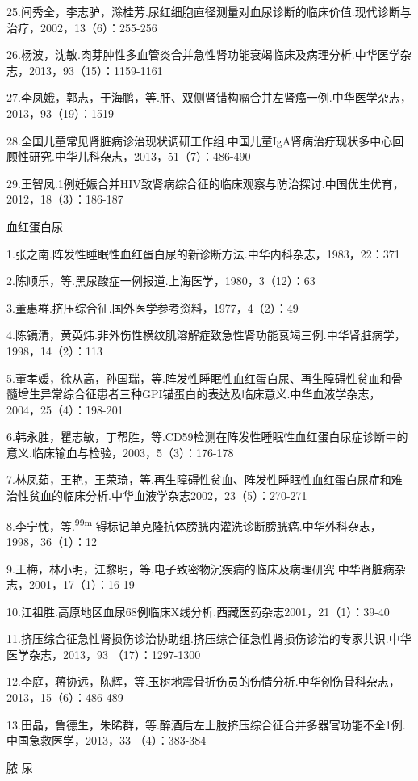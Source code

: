 25.间秀全，李志驴，滁桂芳.尿红细胞直径测量对血尿诊断的临床价值.现代诊断与治疗，2002，13（6）：255-256

26.杨波，沈敏.肉芽肿性多血管炎合并急性肾功能衰竭临床及病理分析.中华医学杂志，2013，93（15）：1159-1161

27.李凤娥，郭志，于海鹏，等.肝、双侧肾错构瘤合并左肾癌一例.中华医学杂志，2013，93（19）：1519

28.全国儿童常见肾脏病诊治现状调研工作组.中国儿童IgA肾病治疗现状多中心回顾性研究.中华儿科杂志，2013，51（7）：486-490

29.王智凤.1例妊娠合并HIV致肾病综合征的临床观察与防治探讨.中国优生优育，2012，18（3）：186-187

血红蛋白尿

1.张之南.阵发性睡眠性血红蛋白尿的新诊断方法.中华内科杂志，1983，22：371

2.陈顺乐，等.黑尿酸症一例报道.上海医学，1980，3（12）：63

3.董惠群.挤压综合征.国外医学参考资料，1977，4（2）：49

4.陈镜清，黄英炜.非外伤性横纹肌溶解症致急性肾功能衰竭三例.中华肾脏病学，1998，14（2）：113

5.董孝媛，徐从高，孙国瑞，等.阵发性睡眠性血红蛋白尿、再生障碍性贫血和骨髓增生异常综合征患者三种GPI锚蛋白的表达及临床意义.中华血液学杂志，2004，25（4）：198-201

6.韩永胜，瞿志敏，丁帮胜，等.CD59检测在阵发性睡眠性血红蛋白尿症诊断中的意义.临床输血与检验，2003，5（3）：176-178

7.林凤茹，王艳，王荣琦，等.再生障碍性贫血、阵发性睡眠性血红蛋白尿症和难治性贫血的临床分析.中华血液学杂志2002，23（5）：270-271

8.李宁忱，等.\textsuperscript{99m}
锝标记单克隆抗体膀胱内灌洗诊断膀胱癌.中华外科杂志，1998，36（1）：12

9.王梅，林小明，江黎明，等.电子致密物沉疾病的临床及病理研究.中华肾脏病杂志，2001，17（1）：16-19

10.江祖胜.高原地区血尿68例临床X线分析.西藏医药杂志2001，21（1）：39-40

11.挤压综合征急性肾损伤诊治协助组.挤压综合征急性肾损伤诊治的专家共识.中华医学杂志，2013，93
（17）：1297-1300

12.李庭，蒋协远，陈辉，等.玉树地震骨折伤员的伤情分析.中华创伤骨科杂志，2013，15（6）：486-489

13.田晶，鲁德生，朱晞群，等.醉酒后左上肢挤压综合征合并多器官功能不全1例.中国急救医学，2013，33
（4）：383-384

脓 尿

